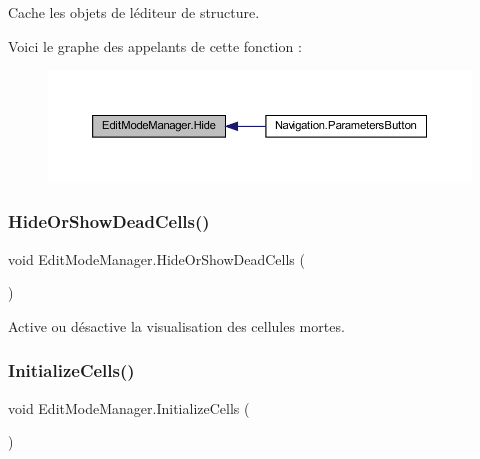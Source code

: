 Cache les objets de l\textquotesingle{}éditeur de structure. 

Voici le graphe des appelants de cette fonction \+:
\nopagebreak
\begin{figure}[H]
\begin{center}
\leavevmode
\includegraphics[width=350pt]{class_edit_mode_manager_aacc30d9cdb3d747fbad20130903ec24e_icgraph}
\end{center}
\end{figure}
\mbox{\label{class_edit_mode_manager_ad64498838abd29826c929cad104924be}} 
\subsubsection{\texorpdfstring{Hide\+Or\+Show\+Dead\+Cells()}{HideOrShowDeadCells()}}
{\footnotesize\ttfamily void Edit\+Mode\+Manager.\+Hide\+Or\+Show\+Dead\+Cells (\begin{DoxyParamCaption}{ }\end{DoxyParamCaption})\hspace{0.3cm}{\ttfamily [inline]}}



Active ou désactive la visualisation des cellules mortes. 

\mbox{\label{class_edit_mode_manager_a8a950f58c809a7161d85e5d9a73e4d15}} 
\subsubsection{\texorpdfstring{Initialize\+Cells()}{InitializeCells()}}
{\footnotesize\ttfamily void Edit\+Mode\+Manager.\+Initialize\+Cells (\begin{DoxyParamCaption}{ }\end{DoxyParamCaption})\hspace{0.3cm}{\ttfamily [inline]}}



